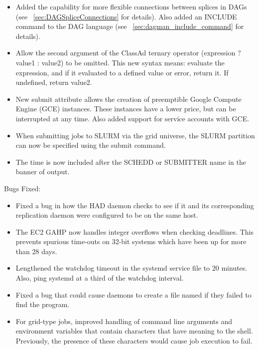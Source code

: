 \begin{itemize}
\item Added the capability for more flexible connections between
splices in DAGs (see ~\ref{sec:DAGSpliceConnections} for details).
Also added an INCLUDE command to the DAG language (see
~\ref{sec:dagman_include_command} for details).

\item Allow the second argument of the ClassAd ternary operator
(expression ? value1 : value2) to be omitted.  This new syntax means:
evaluate the expression, and if it evaluated to a defined value or
error, return it.  If undefined, return value2.

\item New submit attribute  allows the
creation of preemptible Google Compute Engine (GCE) instances.
These instances have a lower price, but can be interrupted at any time.
Also added support for service accounts with GCE.

\item When submitting jobs to SLURM via the grid universe, the SLURM
partition can now be specified using the 
submit command.

\item The time is now included after the SCHEDD or SUBMITTER name
in the banner of  output.

\end{itemize}

\noindent Bugs Fixed:

\begin{itemize}

\item Fixed a bug in how the HAD daemon checks to see if it and its
corresponding replication daemon were configured to be on the same host.

\item The EC2 GAHP now handles integer overflows when checking deadlines.
This prevents spurious time-outs on 32-bit systems which have been up for
more than 28 days.

\item Lengthened the watchdog timeout in the systemd service file to 20 minutes.
Also, ping systemd at a third of the watchdog interval.

\item Fixed a bug that could cause daemons to create a file named
 if they failed to find the 
program.

\item For grid-type  jobs, improved handling of command
line arguments and environment variables that contain characters that
have meaning to the shell.
Previously, the presence of these characters would cause job execution
to fail.

\end{itemize}

